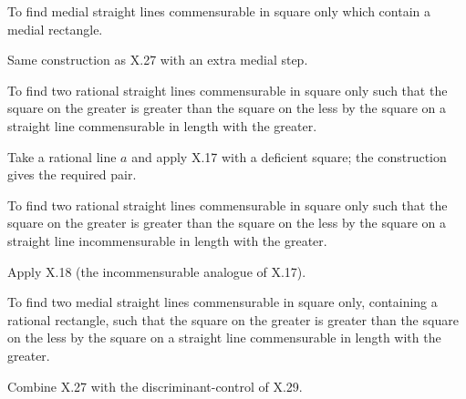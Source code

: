 \documentclass{rrxiv}
\begin{document}
\begin{claim}
\label{prop:X.28}
To find medial straight lines commensurable in square only which
contain a medial rectangle.
\end{claim}
\begin{evidence}[Proof of X.28]
\label{ev:X.28}
Same construction as X.27 with an extra medial step.
\end{evidence}

\begin{claim}
\label{prop:X.29}
To find two rational straight lines commensurable in square only such
that the square on the greater is greater than the square on the
less by the square on a straight line commensurable in length with
the greater.
\end{claim}
\begin{evidence}[Proof of X.29]
\label{ev:X.29}
Take a rational line $a$ and apply X.17 with a deficient square; the
construction gives the required pair.
\end{evidence}

\begin{claim}
\label{prop:X.30}
To find two rational straight lines commensurable in square only such
that the square on the greater is greater than the square on the
less by the square on a straight line incommensurable in length with
the greater.
\end{claim}
\begin{evidence}[Proof of X.30]
\label{ev:X.30}
Apply X.18 (the incommensurable analogue of X.17).
\end{evidence}

\begin{claim}
\label{prop:X.31}
To find two medial straight lines commensurable in square only,
containing a rational rectangle, such that the square on the greater
is greater than the square on the less by the square on a straight
line commensurable in length with the greater.
\end{claim}
\begin{evidence}[Proof of X.31]
\label{ev:X.31}
Combine X.27 with the discriminant-control of X.29.
\end{evidence}
\end{document}
